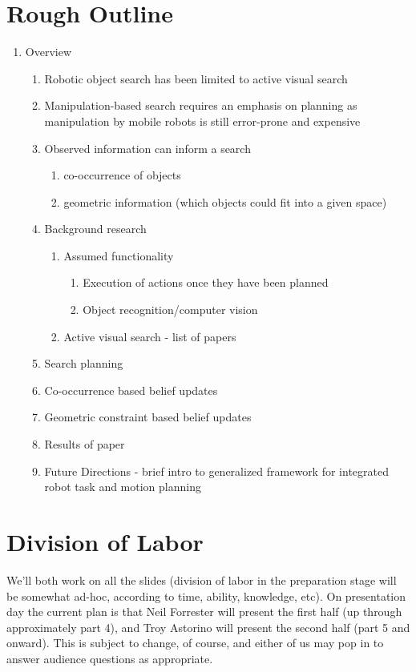 \documentclass{article}
\begin{document}
\section{Rough Outline}
\begin{enumerate}
\item Overview
\begin{enumerate}
\item Robotic object search has been limited to active visual search
\item Manipulation-based search requires an emphasis on planning as manipulation by
mobile robots is still error-prone and expensive
\item Observed information can inform a search
\begin{enumerate}
\item co-occurrence of objects
\item geometric information (which objects could fit into a given space)
\end{enumerate}
\item Background research
\begin{enumerate}
\item Assumed functionality 
\begin{enumerate}
\item Execution of actions once they have been planned
\item Object recognition/computer vision
\end{enumerate}
\item Active visual search - list of papers
\end{enumerate}
\item Search planning
\item Co-occurrence based belief updates
\item Geometric constraint based belief updates
\item Results of paper
\item Future Directions - brief intro to generalized framework for integrated robot task and
motion planning
\end{enumerate}
\end{enumerate}

\section{Division of Labor}
We’ll both work on all the slides (division of labor in the preparation stage
will be somewhat ad-hoc, according to time, ability, knowledge, etc). On
presentation day the current plan is that Neil Forrester will present the first
half (up through approximately part 4), and Troy Astorino will present the
second half (part 5 and onward). This is subject to change, of course, and
either of us may pop in to answer audience questions as appropriate.
\end{document}
